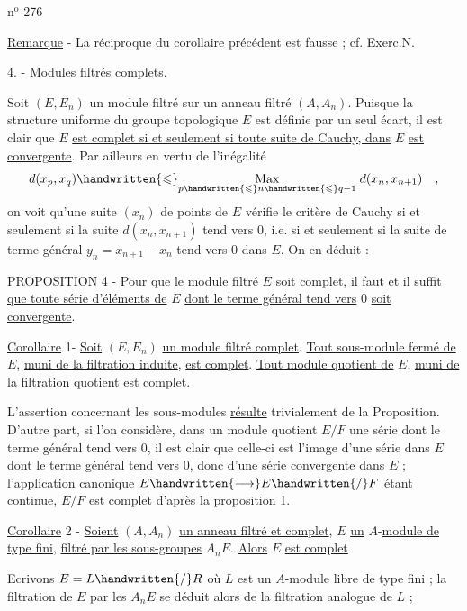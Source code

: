\hfill n$^{\mathrm{o}}$ 276

\uline{Remarque} - La réciproque du corollaire précédent est fausse ; cf. Exerc.N.

4. - \uline{Modules filtrés complets}.

Soit $(E,E_n)$ un module filtré sur un anneau filtré $(A,A_n)$. Puisque la structure uniforme du groupe topologique $E$ est définie par un seul écart, il est clair que $E$ \uline{est complet si et seulement si toute suite de Cauchy, dans} $E$ \uline{est convergente}. Par ailleurs en vertu de l'inégalité
\[
d(x_p,x_q)\handwritten{\leqslant}\underset{p\handwritten{\leqslant} n\handwritten{\leqslant} q-1}{\mathrm{Max}}\;d(x_n,x_{n+1})\quad,
\]
on voit qu'une suite $(x_n)$ de points de $E$ vérifie le critère de Cauchy si et seulement si la suite $d(x_n,x_{n+1})$ tend vers 0, i.e. si et seulement si la suite de terme général $y_n=x_{n+1}-x_n$ tend vers 0 dans $E$. On en déduit :

PROPOSITION 4 - \uline{Pour que le module filtré} $E$ \uline{soit complet}, \uline{il faut et il suffit que toute série d'éléments de} $E$ \uline{dont le terme général tend vers} 0 \uline{soit convergente}.

\uline{Corollaire} 1- \uline{Soit} $(E,E_n)$ \uline{un module filtré complet}. \uline{Tout sous-module fermé de} $E$, \uline{muni de la filtration induite}, \uline{est complet}. \uline{Tout module quotient de} $E$, \uline{muni de la filtration quotient est complet}.

\margin{\handwritten{!}}L'assertion concernant les sous-modules \uline{résulte} trivialement de la Proposition. D'autre part, si l'on considère, dans un module quotient $E/F$ une série dont le terme général tend vers 0, il est clair que celle-ci est l'image d'une série dans $E$ dont le terme général tend vers 0, donc d'une série convergente dans $E$ ; l'application canonique $E\handwritten{\longrightarrow} E\handwritten{/}F$ étant continue, $E/F$ est complet d'après la proposition 1.

\uline{Corollaire} 2 - \uline{Soient} $(A,A_n)$ \uline{un anneau filtré et complet}, $E$ \uline{un} $A$-\uline{module de type fini}, \uline{filtré par les sous-groupes} $A_n E$. \uline{Alors} $E$ \uline{est complet}

Ecrivons $E=L\handwritten{/}R$ où $L$ est un $A$-module libre de type fini ; la filtration de $E$ par les $A_n E$ se déduit alors de la filtration analogue de $L$ ;

